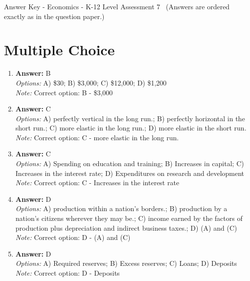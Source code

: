 \documentclass[12pt]{article}
\begin{document}
\begin{center}
Answer Key - Economics - K-12 Level Assessment 7 \
\small (Answers are ordered exactly as in the question paper.)
\end{center}

\section*{Multiple Choice}
\begin{enumerate}[label=\arabic*.]
\item \textbf{Answer:} B
\\ \textit{Options:} A) \$30; B) \$3,000; C) \$12,000; D) \$1,200
\\ \textit{Note:} Correct option: B - \$3,000
\item \textbf{Answer:} C
\\ \textit{Options:} A) perfectly vertical in the long run.; B) perfectly horizontal in the short run.; C) more elastic in the long run.; D) more elastic in the short run.
\\ \textit{Note:} Correct option: C - more elastic in the long run.
\item \textbf{Answer:} C
\\ \textit{Options:} A) Spending on education and training; B) Increases in capital; C) Increases in the interest rate; D) Expenditures on research and development
\\ \textit{Note:} Correct option: C - Increases in the interest rate
\item \textbf{Answer:} D
\\ \textit{Options:} A) production within a nation's borders.; B) production by a nation's citizens wherever they may be.; C) income earned by the factors of production plus depreciation and indirect business taxes.; D) (A) and (C)
\\ \textit{Note:} Correct option: D - (A) and (C)
\item \textbf{Answer:} D
\\ \textit{Options:} A) Required reserves; B) Excess reserves; C) Loans; D) Deposits
\\ \textit{Note:} Correct option: D - Deposits
\end{enumerate}
\end{document}
